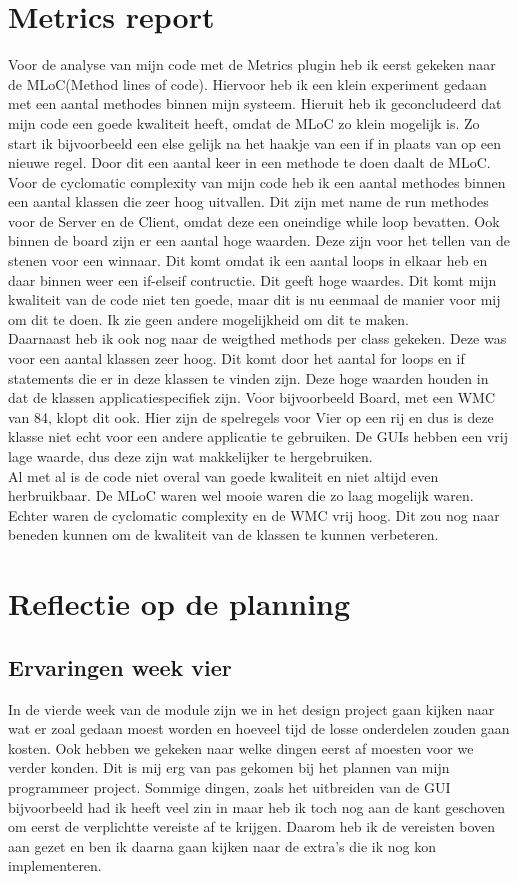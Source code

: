 \documentclass[12pt]{article}
\begin{document}
\section{Metrics report}
Voor de analyse van mijn code met de Metrics plugin heb ik eerst gekeken naar de MLoC(Method lines of code). Hiervoor heb ik een klein experiment gedaan met een aantal methodes binnen mijn systeem. Hieruit heb ik geconcludeerd dat mijn code een goede kwaliteit heeft, omdat de MLoC zo klein mogelijk is. Zo start ik bijvoorbeeld een else gelijk na het haakje van een if in plaats van op een nieuwe regel. Door dit een aantal keer in een methode te doen daalt de MLoC.\\
Voor de cyclomatic complexity van mijn code heb ik een aantal methodes binnen een aantal klassen die zeer hoog uitvallen. Dit zijn met name de run methodes voor de Server en de Client, omdat deze een oneindige while loop bevatten. Ook binnen de board zijn er een aantal hoge waarden. Deze zijn voor het tellen van de stenen voor een winnaar. Dit komt omdat ik een aantal loops in elkaar heb en daar binnen weer een if-elseif contructie. Dit geeft hoge waardes. Dit komt mijn kwaliteit van de code niet ten goede, maar dit is nu eenmaal de manier voor mij om dit te doen. Ik zie geen andere mogelijkheid om dit te maken.\\
Daarnaast heb ik ook nog naar de weigthed methods per class gekeken. Deze was voor een aantal klassen zeer hoog. Dit komt door het aantal for loops en if statements die er in deze klassen te vinden zijn. Deze hoge waarden houden in dat de klassen applicatiespecifiek zijn. Voor bijvoorbeeld Board, met een WMC van 84, klopt dit ook. Hier zijn de spelregels voor Vier op een rij en dus is deze klasse niet echt voor een andere applicatie te gebruiken. De GUIs hebben een vrij lage waarde, dus deze zijn wat makkelijker te hergebruiken.\\
Al met al is de code niet overal van goede kwaliteit en niet altijd even herbruikbaar. De MLoC waren wel mooie waren die zo laag mogelijk waren. Echter waren de cyclomatic complexity en de WMC vrij hoog. Dit zou nog naar beneden kunnen om de kwaliteit van de klassen te kunnen verbeteren.

\section{Reflectie op de planning}
\subsection{Ervaringen week vier}
In de vierde week van de module zijn we in het design project gaan kijken naar wat er zoal gedaan moest worden en hoeveel tijd de losse onderdelen zouden gaan kosten. Ook hebben we gekeken naar welke dingen eerst af moesten voor we verder konden. Dit is mij erg van pas gekomen bij het plannen van mijn programmeer project. Sommige dingen, zoals het uitbreiden van de GUI bijvoorbeeld had ik heeft veel zin in maar heb ik toch nog aan de kant geschoven om eerst de verplichtte vereiste af te krijgen. Daarom heb ik de vereisten boven aan gezet en ben ik daarna gaan kijken naar de extra's die ik nog kon implementeren.\\
\end{document}
